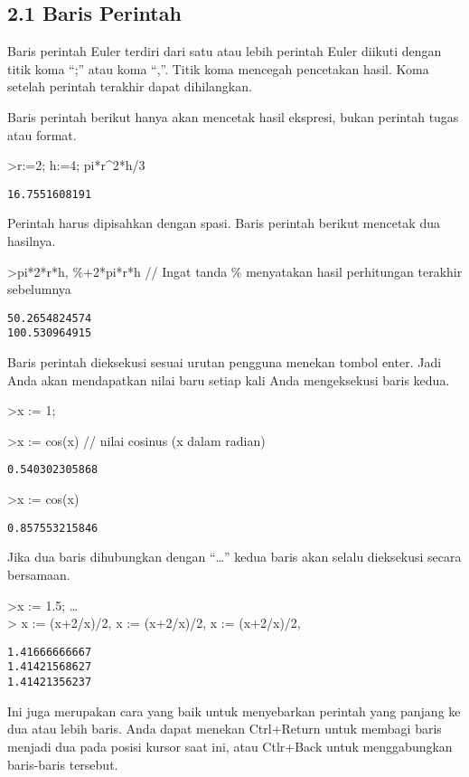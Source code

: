 \documentclass[
]{book}
\begin{document}
\subsection{2.1 Baris Perintah}

Baris perintah Euler terdiri dari satu atau lebih perintah Euler diikuti dengan titik koma ``;'' atau koma ``,''. Titik koma mencegah pencetakan hasil. Koma setelah perintah terakhir dapat dihilangkan.

Baris perintah berikut hanya akan mencetak hasil ekspresi, bukan perintah tugas atau format.

\textgreater r:=2; h:=4; pi*r\^{}2*h/3

\begin{verbatim}
16.7551608191
\end{verbatim}

Perintah harus dipisahkan dengan spasi. Baris perintah berikut mencetak dua hasilnya.

\textgreater pi*2*r*h, \%+2*pi*r*h // Ingat tanda \% menyatakan hasil perhitungan terakhir sebelumnya

\begin{verbatim}
50.2654824574
100.530964915
\end{verbatim}

Baris perintah dieksekusi sesuai urutan pengguna menekan tombol enter. Jadi Anda akan mendapatkan nilai baru setiap kali Anda mengeksekusi baris kedua.

\textgreater x := 1;

\textgreater x := cos(x) // nilai cosinus (x dalam radian)

\begin{verbatim}
0.540302305868
\end{verbatim}

\textgreater x := cos(x)

\begin{verbatim}
0.857553215846
\end{verbatim}

Jika dua baris dihubungkan dengan ``\ldots{}'' kedua baris akan selalu dieksekusi secara bersamaan.

\textgreater x := 1.5; \ldots{}\\
\textgreater{} x := (x+2/x)/2, x := (x+2/x)/2, x := (x+2/x)/2,

\begin{verbatim}
1.41666666667
1.41421568627
1.41421356237
\end{verbatim}

Ini juga merupakan cara yang baik untuk menyebarkan perintah yang panjang ke dua atau lebih baris. Anda dapat menekan Ctrl+Return untuk membagi baris menjadi dua pada posisi kursor saat ini, atau Ctlr+Back untuk menggabungkan baris-baris tersebut.
\end{document}
